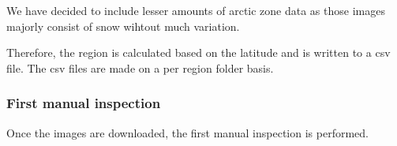 We have decided to include lesser amounts of arctic zone data as those images majorly consist of snow wihtout much variation.

Therefore, the region is calculated based on the latitude and is written to a csv file. The csv files are made on a per region folder basis.

\subsubsection{First manual inspection}
Once the images are downloaded, the first manual inspection is performed.